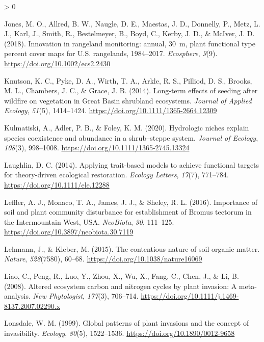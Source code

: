 \documentclass[
  11pt,
  a4paper,
]{article}
\newlength{\cslhangindent}
\newenvironment{CSLReferences}[2] %
 {%
  \setlength{\parindent}{0pt}
  \ifodd #1 \everypar{\setlength{\hangindent}{\cslhangindent}}\ignorespaces\fi
  \ifnum #2 > 0
  \setlength{\parskip}{#2\baselineskip}
  \fi
 }%
 {}
\begin{document}
\begin{CSLReferences}{1}{0}
\leavevmode\hypertarget{ref-Jones2018}{}%
Jones, M. O., Allred, B. W., Naugle, D. E., Maestas, J. D., Donnelly, P., Metz, L. J., Karl, J., Smith, R., Bestelmeyer, B., Boyd, C., Kerby, J. D., \& McIver, J. D. (2018). {Innovation in rangeland monitoring: annual, 30~m, plant functional type percent cover maps for U.S. rangelands, 1984--2017}. \emph{Ecosphere}, \emph{9}(9). \url{https://doi.org/10.1002/ecs2.2430}

\leavevmode\hypertarget{ref-Knutson2014}{}%
Knutson, K. C., Pyke, D. A., Wirth, T. A., Arkle, R. S., Pilliod, D. S., Brooks, M. L., Chambers, J. C., \& Grace, J. B. (2014). {Long-term effects of seeding after wildfire on vegetation in Great Basin shrubland ecosystems}. \emph{Journal of Applied Ecology}, \emph{51}(5), 1414--1424. \url{https://doi.org/10.1111/1365-2664.12309}

\leavevmode\hypertarget{ref-Kulmatiski2020}{}%
Kulmatiski, A., Adler, P. B., \& Foley, K. M. (2020). {Hydrologic niches explain species coexistence and abundance in a shrub--steppe system}. \emph{Journal of Ecology}, \emph{108}(3), 998--1008. \url{https://doi.org/10.1111/1365-2745.13324}

\leavevmode\hypertarget{ref-Laughlin2014}{}%
Laughlin, D. C. (2014). {Applying trait-based models to achieve functional targets for theory-driven ecological restoration}. \emph{Ecology Letters}, \emph{17}(7), 771--784. \url{https://doi.org/10.1111/ele.12288}

\leavevmode\hypertarget{ref-Leffler2016}{}%
Leffler, A. J., Monaco, T. A., James, J. J., \& Sheley, R. L. (2016). {Importance of soil and plant community disturbance for establishment of Bromus tectorum in the Intermountain West, USA}. \emph{NeoBiota}, \emph{30}, 111--125. \url{https://doi.org/10.3897/neobiota.30.7119}

\leavevmode\hypertarget{ref-Lehmann2015}{}%
Lehmann, J., \& Kleber, M. (2015). The contentious nature of soil organic matter. \emph{Nature}, \emph{528}(7580), 60--68. \url{https://doi.org/10.1038/nature16069}

\leavevmode\hypertarget{ref-Liao2008}{}%
Liao, C., Peng, R., Luo, Y., Zhou, X., Wu, X., Fang, C., Chen, J., \& Li, B. (2008). {Altered ecosystem carbon and nitrogen cycles by plant invasion: A meta-analysis}. \emph{New Phytologist}, \emph{177}(3), 706--714. \url{https://doi.org/10.1111/j.1469-8137.2007.02290.x}

\leavevmode\hypertarget{ref-Lonsdale1999}{}%
Lonsdale, W. M. (1999). {Global patterns of plant invasions and the concept of invasibility}. \emph{Ecology}, \emph{80}(5), 1522--1536. \url{https://doi.org/10.1890/0012-9658}


\end{CSLReferences}
\end{document}
